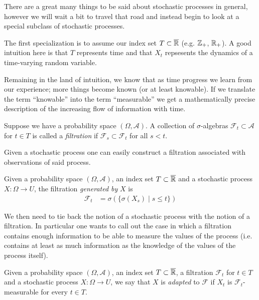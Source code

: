 There are a great many things to be said about stochastic processes in
general, however we will wait a bit to travel that road and instead begin to
look at a special subclass of stochastic processes.

The first specialization is to assume our index set $T \subset \overline{\mathbb{R}}$ (e.g. $\mathbb{Z}_+$,
$\mathbb{R}_+$).  A good intuition here is that $T$ represents time and that
$X_t$ repsesents the dynamics of a time-varying random variable.

Remaining in the land of intuition, we know that as time progress we
learn from our experience; more things become known (or at least
knowable).  If we translate the term ``knowable'' into the term
``measurable'' we get a mathematically precise description of the
increasing flow of information with time.
\begin{defn}Suppose we have a probability space $(\Omega,
  \mathcal{A})$.  A collection of $\sigma$-algebras $\mathcal{F}_t
  \subset \mathcal{A}$ for $t
  \in T$ is called a \emph{filtration} if $\mathcal{F}_s \subset
  \mathcal{F}_t$ for all $s < t$.
\end{defn}

Given a stochastic process one can easily construct a filtration
associated with observations of said process.
\begin{defn}Given a probability space $(\Omega,  \mathcal{A})$, an
  index set $T \subset \overline{\mathbb{R}}$ and a stochastic process $X
  : \Omega \to U$, the filtration \emph{generated by} $X$ is 
\begin{align*}
\mathcal{F}_t &= \sigma(\lbrace \sigma(X_s) \mid s \leq t \rbrace)
\end{align*}
\end{defn}

We then need to tie back the notion of a stochastic process with the
notion of a filtration.  In particular one wants to call out the case
in which a filtration contains enough information to be able to
measure the values of the process (i.e. contains at least as much
information as the knowledge of the values of the process itself).
\begin{defn}Given a probability space $(\Omega,  \mathcal{A})$, an
  index set $T \subset \overline{\mathbb{R}}$, a
  filtration $\mathcal{F}_t$ for $t \in T$ and a stochastic process $X
  : \Omega \to U$, we say that $X$ is \emph{adapted} to $\mathcal{F}$
  if $X_t$ is $\mathcal{F}_t$-measurable for every $t \in T$.
\end{defn}

